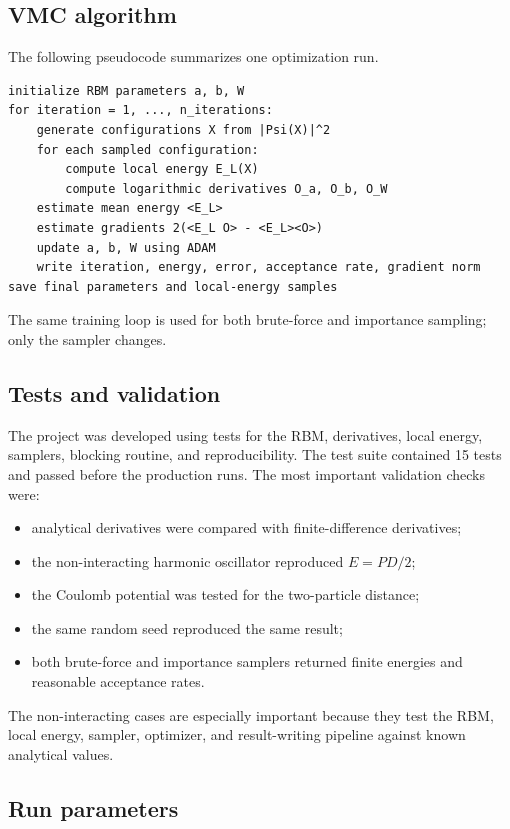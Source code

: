 \documentclass[10pt,a4paper]{article}
\begin{document}
\subsection{VMC algorithm}

The following pseudocode summarizes one optimization run.

\begin{lstlisting}[caption={Pseudocode for the RBM/VMC optimization used in the project.},label={lst:vmc}]
initialize RBM parameters a, b, W
for iteration = 1, ..., n_iterations:
    generate configurations X from |Psi(X)|^2
    for each sampled configuration:
        compute local energy E_L(X)
        compute logarithmic derivatives O_a, O_b, O_W
    estimate mean energy <E_L>
    estimate gradients 2(<E_L O> - <E_L><O>)
    update a, b, W using ADAM
    write iteration, energy, error, acceptance rate, gradient norm
save final parameters and local-energy samples
\end{lstlisting}

The same training loop is used for both brute-force and importance sampling; only the sampler changes.

\subsection{Tests and validation}

The project was developed using tests for the RBM, derivatives, local energy, samplers, blocking routine, and reproducibility. The test suite contained 15 tests and passed before the production runs. The most important validation checks were:
\begin{itemize}[leftmargin=*]
    \item analytical derivatives were compared with finite-difference derivatives;
    \item the non-interacting harmonic oscillator reproduced $E=PD/2$;
    \item the Coulomb potential was tested for the two-particle distance;
    \item the same random seed reproduced the same result;
    \item both brute-force and importance samplers returned finite energies and reasonable acceptance rates.
\end{itemize}
The non-interacting cases are especially important because they test the RBM, local energy, sampler, optimizer, and result-writing pipeline against known analytical values.

\subsection{Run parameters}
\end{document}
